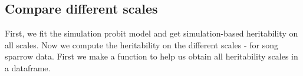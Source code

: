 \begin{Shaded}
\begin{Highlighting}[]
\NormalTok{,}
    
\NormalTok{)}
\NormalTok{,}
   \NormalTok{, }
   
\NormalTok{)}
\NormalTok{,}
   \NormalTok{, }
   
\NormalTok{)}
\end{Highlighting}
\end{Shaded}

\hypertarget{compare-different-scales}{%
\subsection*{Compare different scales}\label{compare-different-scales}}

First, we fit the simulation probit model and get simulation-based
heritability on all scales. Now we compute the heritability on the
different scales - for song sparrow data. First we make a function to
help us obtain all heritability scales in a dataframe.

